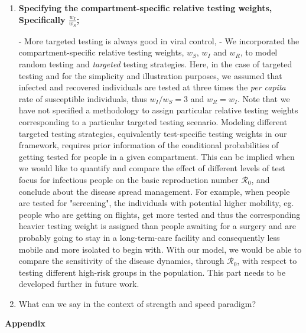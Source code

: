 \documentclass[12pt]{article}
\newcommand{\percap}{\emph{per capita}\xspace}
\newcommand{\Rnum}{\ensuremath{\mathcal{R}_0}}
\DeclareRobustCommand\_{\ifmmode\expandafter\subtxt\else\textunderscore\fi}
\theoremstyle{definition} %
\begin{document}
\begin{enumerate}
\item {\bf Specifying the compartment-specific relative testing weights, Specifically $\frac{w_I}{w_S}$;}

- More targeted testing is always good in viral control,
- We incorporated the compartment-specific relative testing weights, $w_S$, $w_I$ and $w_R$, to model random testing and \emph{targeted} testing strategies. Here, in the case of targeted testing and for the simplicity and illustration purposes, we assumed that infected and recovered individuals are tested at three times the \percap rate of susceptible individuals, thus $w_I/w_S=3$ and $w_R=w_I$. Note that we have not specified a methodology to assign particular relative testing weights corresponding to a particular targeted testing scenario. 
Modeling different targeted testing strategies, equivalently test-specific testing weights in our framework, requires prior information of the conditional probabilities of getting tested for people in a given compartment. 
This can be implied when we would like to quantify and compare the effect of different levels of test focus for infectious people on the basic reproduction number $\Rnum$, and conclude about the disease spread management. For example, when people are tested for "screening", the individuals with potential higher mobility, eg. people who are getting on flights, get more tested and thus the corresponding heavier testing weight is assigned than people awaiting for a surgery and are probably going to stay in a long-term-care facility and consequently less mobile and more isolated to begin with. With our model, we would be able to compare the sensitivity of the disease dynamics, through $\Rnum$, with respect to testing different high-risk groups in the population. This part needs to be developed further in future work.

\item What can we say in the context of strength and speed paradigm?

\end{enumerate}



\clearpage
\begin{center}
\textbf{\large Appendix}
\end{center}
\setcounter{equation}{0}
\setcounter{figure}{0}
\setcounter{table}{0}
\makeatletter
\renewcommand{\theequation}{A\arabic{equation}}
\renewcommand{\thefigure}{A\arabic{figure}}
\renewcommand{\bibnumfmt}[1]{[A#1]}
\renewcommand{\citenumfont}[1]{A#1}
\end{document}
